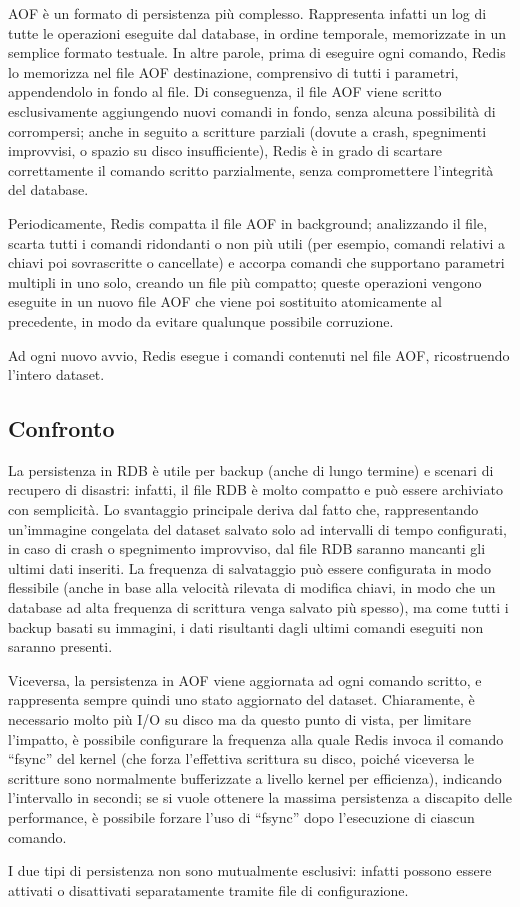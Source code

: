 AOF è un formato di persistenza più complesso. Rappresenta infatti un log di tutte le operazioni
eseguite dal database, in ordine temporale, memorizzate in un semplice formato testuale. In altre
parole, prima di eseguire ogni comando, Redis lo memorizza nel file AOF destinazione, comprensivo di
tutti i parametri, appendendolo in fondo al file. Di conseguenza, il file AOF viene scritto
esclusivamente aggiungendo nuovi comandi in fondo, senza alcuna possibilità di corrompersi; anche in
seguito a scritture parziali (dovute a crash, spegnimenti improvvisi, o spazio su disco
insufficiente), Redis è in grado di scartare correttamente il comando scritto parzialmente, senza
compromettere l'integrità del database.

Periodicamente, Redis compatta il file AOF in background; analizzando il file, scarta tutti i
comandi ridondanti o non più utili (per esempio, comandi relativi a chiavi poi sovrascritte o
cancellate) e accorpa comandi che supportano parametri multipli in uno solo, creando un file più
compatto; queste operazioni vengono eseguite in un nuovo file AOF che viene poi sostituito
atomicamente al precedente, in modo da evitare qualunque possibile corruzione.

Ad ogni nuovo avvio, Redis esegue i comandi contenuti nel file AOF, ricostruendo l'intero dataset.


\subsection{Confronto}

La persistenza in RDB è utile per backup (anche di lungo termine) e scenari di recupero di
disastri: infatti, il file RDB è molto compatto e può essere archiviato con semplicità. Lo
svantaggio principale deriva dal fatto che, rappresentando un'immagine congelata del dataset
salvato solo ad intervalli di tempo configurati, in caso di crash o spegnimento improvviso,
dal file RDB saranno mancanti gli ultimi dati inseriti. La frequenza di salvataggio può essere
configurata in modo flessibile (anche in base alla velocità rilevata di modifica chiavi, in modo
che un database ad alta frequenza di scrittura venga salvato più spesso), ma come tutti i backup
basati su immagini, i dati risultanti dagli ultimi comandi eseguiti non saranno presenti.

Viceversa, la persistenza in AOF viene aggiornata ad ogni comando scritto, e rappresenta sempre
quindi uno stato aggiornato del dataset. Chiaramente, è necessario molto più I/O su disco ma
da questo punto di vista, per limitare l'impatto, è possibile configurare la frequenza alla
quale Redis invoca il comando ``fsync'' del kernel (che forza l'effettiva scrittura su
disco, poiché viceversa le scritture sono normalmente bufferizzate a livello kernel per
efficienza), indicando l'intervallo in secondi; se si vuole ottenere la massima persistenza a
discapito delle performance, è possibile forzare l'uso di ``fsync'' dopo l'esecuzione di
ciascun comando.

I due tipi di persistenza non sono mutualmente esclusivi: infatti possono essere attivati o 
disattivati separatamente tramite file di configurazione.





